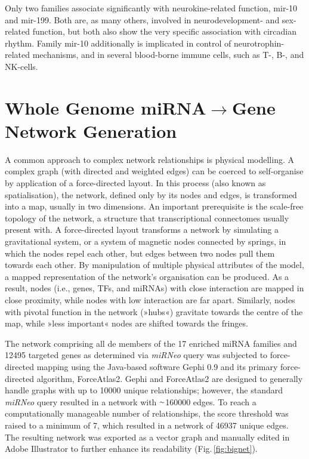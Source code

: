 Only two families associate significantly with neurokine-related function, mir-10 and mir-199. Both are, as many others, involved in neurodevelopment- and sex-related function, but both also show the very specific association with circadian rhythm. Family mir-10 additionally is implicated in control of neurotrophin-related mechanisms, and in several blood-borne immune cells, such as T-, B-, and NK-cells.

\section{Whole Genome miRNA$\to$Gene Network Generation} \label{sec:cellculture:network}
A common approach to complex network relationships is physical modelling. A complex graph (with directed and weighted edges) can be coerced to self-organise by application of a force-directed layout. In this process (also known as spatialisation), the network, defined only by its nodes and edges, is transformed into a map, usually in two dimensions. An important prerequisite is the scale-free topology of the network, a structure that transcriptional connectomes usually present with.\cite{Broido2019} A force-directed layout transforms a network by simulating a gravitational system, or a system of magnetic nodes connected by springs, in which the nodes repel each other, but edges between two nodes pull them towards each other. By manipulation of multiple physical attributes of the model, a mapped representation of the network's organisation can be produced. As a result, nodes (i.e., genes, TFs, and miRNAs) with close interaction are mapped in close proximity, while nodes with low interaction are far apart. Similarly, nodes with pivotal function in the network (»hubs«) gravitate towards the centre of the map, while »less important« nodes are shifted towards the fringes.

\begin{method}

The network comprising all \ac{de} members of the 17 enriched miRNA families and \num{12495} targeted genes as determined via \textit{miRNeo} query was subjected to force-directed mapping using the Java-based software Gephi 0.9 and its primary force-directed algorithm, ForceAtlas2.\cite{Jacomy2014} Gephi and ForceAtlas2 are designed to generally handle graphs with up to \num{10000} unique relationships; however, the standard \textit{miRNeo} query resulted in a network with $\smallsim$\num{160000} edges. To reach a computationally manageable number of relationships, the score threshold was raised to a minimum of 7, which resulted in a network of \num{46937} unique edges. The resulting network was exported as a vector graph and manually edited in Adobe Illustrator to further enhance its readability (Fig.\,\ref{fig:bignet}).

\end{method}

